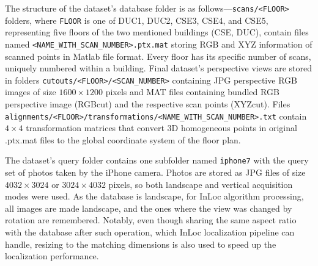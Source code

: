 The structure of the dataset's database folder is as follows---\verb|scans/<FLOOR>|
folders, where \verb|FLOOR| is one of DUC1, DUC2, CSE3, CSE4, and CSE5, representing five
floors of the two mentioned buildings (CSE, DUC), contain files named
\verb|<NAME_WITH_SCAN_NUMBER>.ptx.mat| storing RGB and XYZ information of scanned points
in Matlab file format. Every floor has its specific number of scans, uniquely numbered
within a building. Final dataset's perspective views are stored in folders
\verb|cutouts/<FLOOR>/<SCAN_NUMBER>| containing JPG perspective RGB images of size
$1600\times1200$ pixels and MAT files containing bundled RGB perspective image (RGBcut)
and the respective scan points (XYZcut). Files
\verb|alignments/<FLOOR>/transformations/<NAME_WITH_SCAN_NUMBER>.txt| contain $4\times4$
transformation matrices that convert 3D homogeneous points in original .ptx.mat files to
the global coordinate system of the floor plan.

The dataset's query folder contains one subfolder named \verb|iphone7| with the query set
of photos taken by the iPhone camera. Photos are stored as JPG files of size
$4032\times3024$ or $3024\times4032$ pixels, so both landscape and vertical acquisition
modes were used. As the database is landscape, for InLoc algorithm processing, all images
are made landscape, and the ones where the view was changed by rotation are remembered.
Notably, even though sharing the same aspect ratio with the database after such operation,
which InLoc localization pipeline can handle, resizing to the matching dimensions is also
used to speed up the localization performance.

